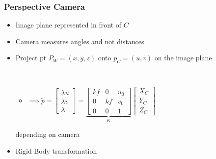 \subsubsection{Perspective Camera}
\begin{itemize}
    \item Image plane represented in front of $C$
    \item Camera measures angles and not distances
    \item Project pt $P_W = (x,y,z)$ onto $p_C = (u,v)$ on the image plane
    \\
        \\
        \begin{itemize}
            \item $\implies \tilde p =
                \begin{bmatrix}
                    \lambda u\\
                    \lambda v\\
                    \lambda
                \end{bmatrix} =
                \underbrace{
                \begin{bmatrix}
                    kf & 0 & u_0\\
                    0 & kf & v_0\\
                    0 & 0 & 1
                \end{bmatrix}}_{K}
                \begin{bmatrix}
                    X_C\\
                    Y_C\\
                    Z_C
                \end{bmatrix}$
        \end{itemize}
     depending on camera
    \item Rigid Body transformation\\

\end{itemize}
